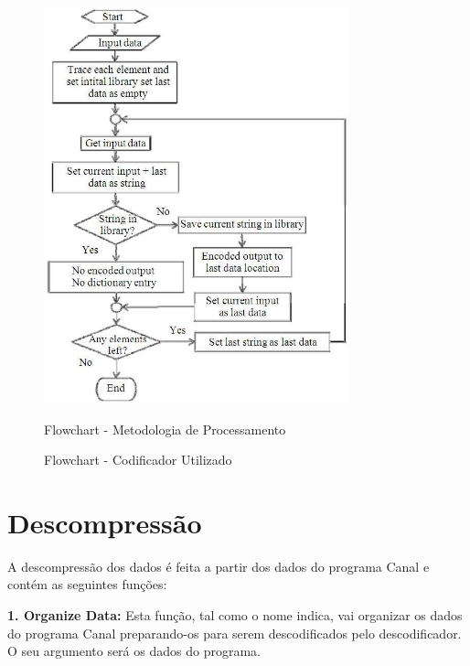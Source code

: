 \documentclass{article}
\begin{document}
\begin{titlepage}
\begin{figure}[!ht]
        \centering
        \includegraphics[width=250pt]{LZW-encoder.png}
        \vspace{1cm}
        \caption{Flowchart - Metodologia de Processamento}
        \caption{Flowchart - Codificador Utilizado}
    \end{figure}
    
\clearpage

\section{Descompressão}
    A descompressão dos dados é feita a partir dos dados do programa Canal e contém as seguintes funções:
    \vspace{0.5cm}
    
    \indent\textbf{1. Organize Data:}
    Esta função, tal como o nome indica, vai organizar os dados do programa Canal preparando-os para serem descodificados pelo descodificador. O seu argumento será os dados do programa.
    \vspace{0.5cm}
    

\end{titlepage}
\end{document}

